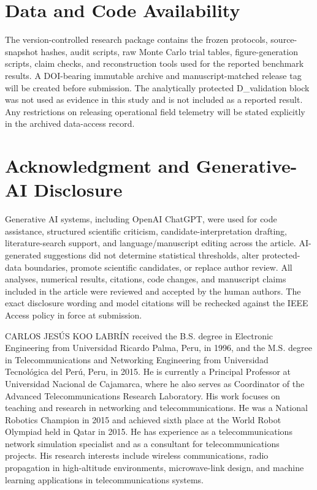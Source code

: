 \documentclass{ieeeaccess}
\begin{document}
\section*{Data and Code Availability}\label{data-and-code-availability}

The version-controlled research package contains the frozen protocols, source-snapshot hashes, audit scripts, raw Monte Carlo trial tables, figure-generation scripts, claim checks, and reconstruction tools used for the reported benchmark results. A DOI-bearing immutable archive and manuscript-matched release tag will be created before submission. The analytically protected D\_validation block was not used as evidence in this study and is not included as a reported result. Any restrictions on releasing operational field telemetry will be stated explicitly in the archived data-access record.

\section*{Acknowledgment and Generative-AI Disclosure}\label{acknowledgment-and-generative-ai-disclosure}

Generative AI systems, including OpenAI ChatGPT, were used for code assistance, structured scientific criticism, candidate-interpretation drafting, literature-search support, and language/manuscript editing across the article. AI-generated suggestions did not determine statistical thresholds, alter protected-data boundaries, promote scientific candidates, or replace author review. All analyses, numerical results, citations, code changes, and manuscript claims included in the article were reviewed and accepted by the human authors. The exact disclosure wording and model citations will be rechecked against the IEEE Access policy in force at submission.


\begin{IEEEbiographynophoto}{CARLOS JESÚS KOO LABRÍN}
received the B.S. degree in Electronic Engineering from Universidad Ricardo Palma, Peru, in 1996, and the M.S. degree in Telecommunications and Networking Engineering from Universidad Tecnológica del Perú, Peru, in 2015. He is currently a Principal Professor at Universidad Nacional de Cajamarca, where he also serves as Coordinator of the Advanced Telecommunications Research Laboratory. His work focuses on teaching and research in networking and telecommunications. He was a National Robotics Champion in 2015 and achieved sixth place at the World Robot Olympiad held in Qatar in 2015. He has experience as a telecommunications network simulation specialist and as a consultant for telecommunications projects. His research interests include wireless communications, radio propagation in high-altitude environments, microwave-link design, and machine learning applications in telecommunications systems.
\end{IEEEbiographynophoto}
\end{document}

